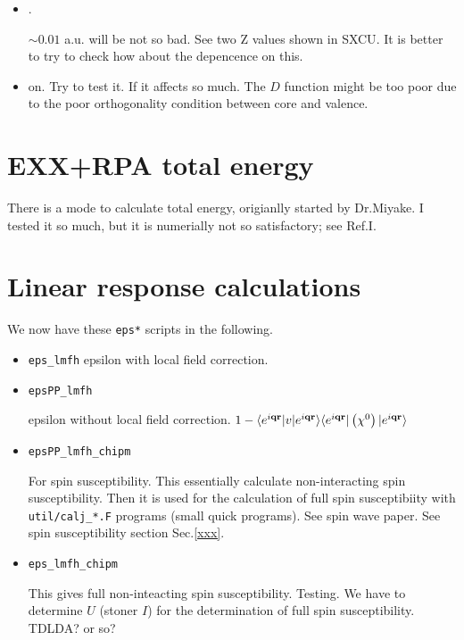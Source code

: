\documentclass[a4paper,10pt,epsf,fleqn]{article}
\newcommand{\keyw}[1]{\fbox{\tt #1}}
\newcommand{\bfq}{{\bf q}}
\newcommand{\bfr}{{\bf r}}
\newcommand{\raw}[1]{{\tt #1}}
\newcommand{\eiqr}{e^{i \bfq \bfr}}
\begin{document}
{{{\begin{itemize}
\item
\keyw{deltaw}.

$\sim 0.01$ a.u. will be not so bad. 
See two Z values shown in {\sf SXCU}. 
It is better to try to check how about the depencence on this.

\item
\keyw{CoreOrth} on. Try to test it. 
If it affects so much. The $D$ function might be too poor
due to the poor orthogonality condition 
between core and valence.


\end{itemize}

\section{EXX+RPA total energy}
There is a mode to calculate total energy, origianlly started by Dr.Miyake.
I tested it so much, but it is numerially not so satisfactory;
see Ref.I.




\newpage
\section{Linear response calculations}
\label{linearr}
We now have these \verb#eps*# scripts in the following. 

\begin{itemize}
\item \raw{eps\_lmfh} 
   epsilon with local field correction.

\item \raw{epsPP\_lmfh}

   epsilon without local field correction.
   $1- \langle \eiqr |v|\eiqr\rangle  \langle \eiqr| \left( \chi^{0} \right) |\eiqr\rangle$


\item \raw{epsPP\_lmfh\_chipm}

    For spin susceptibility. This essentially calculate non-interacting spin susceptibility.
    Then it is used for the calculation of full spin susceptibiity with \verb#util/calj_*.F# programs
    (small quick programs). See spin wave paper.
    See spin susceptibility section Sec.\ref{xxx}.

\item \raw{eps\_lmfh\_chipm}

    This gives full non-inteacting spin susceptibility. Testing.
    We have to determine $U$ (stoner $I$) for the determination of full spin susceptibility.
    TDLDA? or so?



\end{itemize}}}}
\end{document}
